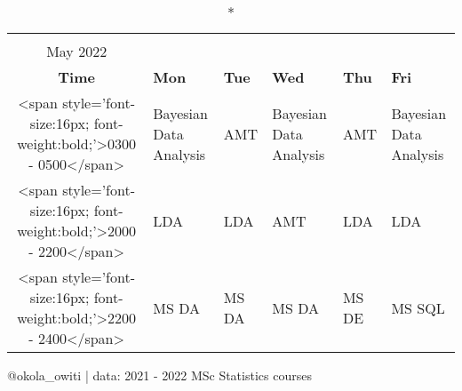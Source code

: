 \captionsetup[table]{labelformat=empty,skip=1pt}
\begin{longtable}{clllll}
\caption*{
{\large \textbf{2021 - 2022 Study Schedule}} \\ 
{\small May 2022}
} \\ 
\toprule
\textbf{Time} & \textbf{Mon} & \textbf{Tue} & \textbf{Wed} & \textbf{Thu} & \textbf{Fri} \\ 
\midrule
<span style='font-size:16px; font-weight:bold;'>0300 - 0500</span> & Bayesian
Data Analysis & AMT & Bayesian
Data Analysis & AMT & Bayesian
Data Analysis \\ 
<span style='font-size:16px; font-weight:bold;'>2000 - 2200</span> & LDA & LDA & AMT & LDA & LDA \\ 
<span style='font-size:16px; font-weight:bold;'>2200 - 2400</span> & MS DA & MS DA & MS DA & MS DE & MS SQL \\ 
 \bottomrule
\end{longtable}
\begin{minipage}{\linewidth}
@okola\_owiti | data: 2021 - 2022 MSc Statistics courses \\ 
\end{minipage}

